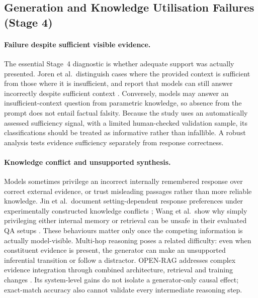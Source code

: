 \subsection{Generation and Knowledge Utilisation Failures (Stage 4)}
\label{subsec:section6-generation}

\paragraph{Failure despite sufficient visible evidence.}
The essential Stage~4 diagnostic is whether adequate support was actually presented. Joren et al.\ distinguish cases where the provided context is sufficient from those where it is insufficient, and report that models can still answer incorrectly despite sufficient context \cite[Secs.~3--4]{joren2025sufficient}. Conversely, models may answer an insufficient-context question from parametric knowledge, so absence from the prompt does not entail factual falsity. Because the study uses an automatically assessed sufficiency signal, with a limited human-checked validation sample, its classifications should be treated as informative rather than infallible. A robust analysis tests evidence sufficiency separately from response correctness.

\paragraph{Knowledge conflict and unsupported synthesis.}
Models sometimes privilege an incorrect internally remembered response over correct external evidence, or trust misleading passages rather than more reliable knowledge. Jin et al.\ document setting-dependent response preferences under experimentally constructed knowledge conflicts \cite[Secs.~3--5]{jin2024tug}; Wang et al.\ show why simply privileging either internal memory or retrieval can be unsafe in their evaluated QA setups \cite[Secs.~3--5]{wang2025astute}. These behaviours matter only once the competing information is actually model-visible. Multi-hop reasoning poses a related difficulty: even when constituent evidence is present, the generator can make an unsupported inferential transition or follow a distractor. OPEN-RAG addresses complex evidence integration through combined architecture, retrieval and training changes \cite[Secs.~2--4]{islam2024openrag}. Its system-level gains do not isolate a generator-only causal effect; exact-match accuracy also cannot validate every intermediate reasoning step.

